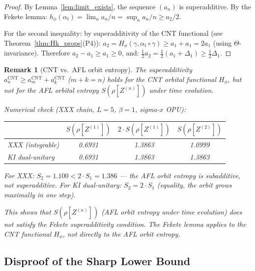 \documentclass[12pt,a4paper]{article}
\newtheorem{remark}[theorem]{Remark}
\newcommand{\thetaaut}{\Theta}
\newcommand{\Hphi}{H_{\phi}}
\begin{document}
\begin{proof}
By Lemma~\ref{lem:limit_exists}, the sequence $(a_n)$ is superadditive.
By the Fekete lemma: $h_\phi(\alpha_t) = \lim_n a_n/n = \sup_n a_n/n \ge a_2/2$.

For the second inequality: by superadditivity of the CNT functional (see
Theorem~\ref{thm:Hk_props}(P4)):
$a_2 = \Hphi(\gamma,\alpha_t\circ\gamma) \ge a_1 + a_1 = 2a_1$ (using $\thetaaut$-invariance).
Therefore $a_2 - a_1 \ge a_1 \ge 0$, and:
$\frac{1}{2}a_2 = \frac{1}{2}(a_1+\Delta_1) \ge \frac{1}{2}\Delta_1$.
\end{proof}

\begin{remark}[CNT vs.\ AFL orbit entropy]\label{rmk:cnt_vs_afl_super}
The superadditivity $a_n^{\mathrm{CNT}} \ge a_m^{\mathrm{CNT}}+a_k^{\mathrm{CNT}}$ ($m+k=n$)
holds for the \emph{CNT} orbital functional $H_\phi$, but \emph{not} for the
\emph{AFL} orbital entropy $S(\rho[Z^{(n)}])$ under time evolution.

Numerical check (XXX chain, $L=5$, $\beta=1$, sigma-$x$ OPU):
\begin{center}
\begin{tabular}{@{}lccc@{}}
\toprule
 & $S(\rho[Z^{(1)}])$ & $2\cdot S(\rho[Z^{(1)}])$ & $S(\rho[Z^{(2)}])$ \\
\midrule
XXX (integrable) & 0.6931 & 1.3863 & 1.0999 \\
KI dual-unitary & 0.6931 & 1.3863 & 1.3863 \\
\bottomrule
\end{tabular}
\end{center}
For XXX: $S_2 = 1.100 < 2\cdot S_1 = 1.386$ --- the AFL orbit entropy is
\emph{subadditive}, not superadditive.
For KI dual-unitary: $S_2 = 2\cdot S_1$ (equality, the orbit grows maximally in one step).

This shows that $S(\rho[Z^{(n)}])$ (AFL orbit entropy under time evolution) does
\emph{not} satisfy the Fekete superadditivity condition.  The Fekete lemma applies
to the \emph{CNT} functional $H_\phi$, not directly to the AFL orbit entropy.
\end{remark}

\subsection{Disproof of the Sharp Lower Bound}
\end{document}
